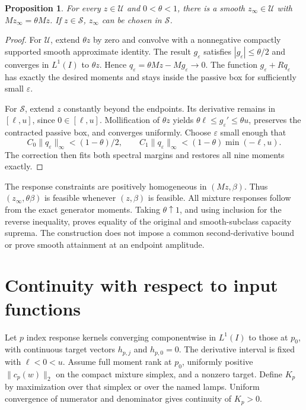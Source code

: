 \documentclass[9pt]{osa-supplemental-document}
\newtheorem{proposition}{Proposition}
\begin{document}
\begin{proposition}
For every $z\in\mathcal U$ and $0<\theta<1$, there is a smooth $z_\infty\in\mathcal U$ with $Mz_\infty=\theta Mz$. If $z\in\mathcal S$, $z_\infty$ can be chosen in $\mathcal S$.
\end{proposition}
\begin{proof}
For $\mathcal U$, extend $\theta z$ by zero and convolve with a nonnegative compactly supported smooth approximate identity. The result $g_\varepsilon$ satisfies $|g_\varepsilon|\leq\theta/2$ and converges in $L^1(I)$ to $\theta z$. Hence $q_\varepsilon=\theta Mz-Mg_\varepsilon\to0$. The function $g_\varepsilon+Rq_\varepsilon$ has exactly the desired moments and stays inside the passive box for sufficiently small $\varepsilon$.

For $\mathcal S$, extend $z$ constantly beyond the endpoints. Its derivative remains in $[\ell,u]$, since $0\in[\ell,u]$. Mollification of $\theta z$ yields $\theta\ell\leq g_\varepsilon'\leq\theta u$, preserves the contracted passive box, and converges uniformly. Choose $\varepsilon$ small enough that
\begin{equation}
 C_0\|q_\varepsilon\|_\infty<(1-\theta)/2,\qquad
 C_1\|q_\varepsilon\|_\infty<(1-\theta)\min(-\ell,u).
\end{equation}
The correction then fits both spectral margins and restores all nine moments exactly.
\end{proof}

The response constraints are positively homogeneous in $(Mz,\beta)$. Thus $(z_\infty,\theta\beta)$ is feasible whenever $(z,\beta)$ is feasible. All mixture responses follow from the exact generator moments. Taking $\theta\uparrow1$, and using inclusion for the reverse inequality, proves equality of the original and smooth-subclass capacity suprema. The construction does not impose a common second-derivative bound or prove smooth attainment at an endpoint amplitude.

\section{Continuity with respect to input functions}
Let $p$ index response kernels converging componentwise in $L^1(I)$ to those at $p_0$, with continuous target vectors $h_{p,j}$ and $h_{p,0}=0$. The derivative interval is fixed with $\ell<0<u$. Assume full moment rank at $p_0$, uniformly positive $\|c_p(w)\|_2$ on the compact mixture simplex, and a nonzero target. Define $K_p$ by maximization over that simplex or over the named lamps. Uniform convergence of numerator and denominator gives continuity of $K_p>0$.
\end{document}
